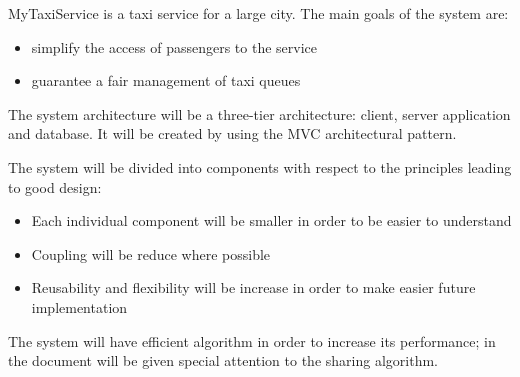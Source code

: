  
MyTaxiService is a taxi service for a large city.
The main goals of the system are: 

\begin{itemize} 
	\item simplify the access of passengers to the service
	\item guarantee a fair management of taxi queues
\end{itemize}

The system architecture will be a three-tier architecture: client, server application and database. It will be created by using the MVC architectural pattern.

The system will be divided into components with respect to the principles leading to good design:
\begin{itemize}
	\item Each individual component will be smaller in order to be easier to understand
	\item Coupling will be reduce where possible
	\item Reusability and flexibility will be increase in order to make easier future implementation
\end{itemize}

The system will have efficient algorithm in order to increase its performance; 
in the document will be given special attention to the sharing algorithm.
